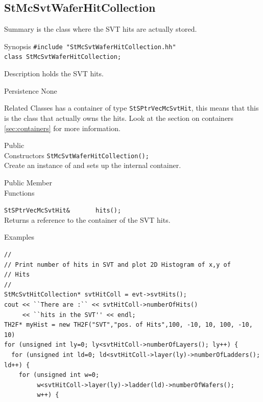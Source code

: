 \subsection{StMcSvtWaferHitCollection}
 
\label{sec:StMcSvtWaferHitCollection}
\begin{Entry}
\item[Summary]
     is the class where the SVT hits
    are actually stored.

\item[Synopsis]
    \verb+#include "StMcSvtWaferHitCollection.hh"+\\
    \verb+class StMcSvtWaferHitCollection;+\\

\item[Description]
     holds the SVT hits.

\item[Persistence]
    None

\item[Related Classes]
    has a container of type {\tt StSPtrVecMcSvtHit}, this means
    that this is the class that actually owns the hits.  Look
    at the section on containers \ref{sec:containers} for more
    information.    
\item[Public\\ Constructors]
    \verb+StMcSvtWaferHitCollection();+\\
    Create an instance of 
    and sets up the internal container.

\item[Public Member\\ Functions]

    \verb+StSPtrVecMcSvtHit&       hits();+\\
    Returns a reference to the container of the SVT hits.
    
\item[Examples]
{\footnotesize
\begin{verbatim}
//
// Print number of hits in SVT and plot 2D Histogram of x,y of
// Hits
//  
StMcSvtHitCollection* svtHitColl = evt->svtHits();
cout << ``There are :`` << svtHitColl->numberOfHits()
     << ``hits in the SVT'' << endl; 
TH2F* myHist = new TH2F("SVT","pos. of Hits",100, -10, 10, 100, -10, 10)
for (unsigned int ly=0; ly<svtHitColl->numberOfLayers(); ly++) {
  for (unsigned int ld=0; ld<svtHitColl->layer(ly)->numberOfLadders(); ld++) {
    for (unsigned int w=0;
         w<svtHitColl->layer(ly)->ladder(ld)->numberOfWafers();
         w++) {


\end{verbatim}}
\end{Entry}
